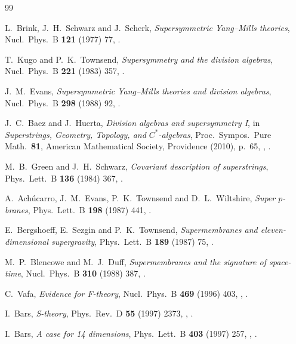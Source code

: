 \begin{thebibliography}{99}

L.~Brink, J.~H.~Schwarz and J.~Scherk, \textit{Supersymmetric Yang--Mills theories}, Nucl.\ Phys.\ B \textbf{121} (1977) 77, .

T.~Kugo and P.~K.~Townsend, \textit{Supersymmetry and the division algebras}, Nucl.\ Phys.\ B \textbf{221} (1983) 357, .

J.~M.~Evans, \textit{Supersymmetric Yang--Mills theories and division algebras}, Nucl.\ Phys.\ B \textbf{298} (1988) 92, .

J.~C.~Baez and J.~Huerta, \textit{Division algebras and supersymmetry I}, in \textit{Superstrings, Geometry, Topology, and $C^*$-algebras}, Proc.\ Sympos.\ Pure Math.\ \textbf{81}, American Mathematical Society, Providence (2010), p.~65, , .

M.~B.~Green and J.~H.~Schwarz, \textit{Covariant description of superstrings}, Phys.\ Lett.\ B \textbf{136} (1984) 367, .

A.~Ach\'ucarro, J.~M.~Evans, P.~K.~Townsend and D.~L.~Wiltshire, \textit{Super $p$-branes}, Phys.\ Lett.\ B \textbf{198} (1987) 441, .

E.~Bergshoeff, E.~Sezgin and P.~K.~Townsend, \textit{Supermembranes and eleven-dimensional supergravity}, Phys.\ Lett.\ B \textbf{189} (1987) 75, .

M.~P.~Blencowe and M.~J.~Duff, \textit{Supermembranes and the signature of space-time}, Nucl.\ Phys.\ B \textbf{310} (1988) 387, .

C.~Vafa, \textit{Evidence for F-theory}, Nucl.\ Phys.\ B \textbf{469} (1996) 403, , .

I.~Bars, \textit{S-theory}, Phys.\ Rev.\ D \textbf{55} (1997) 2373, , .

I.~Bars, \textit{A case for 14 dimensions}, Phys.\ Lett.\ B \textbf{403} (1997) 257, , .


\end{thebibliography}
